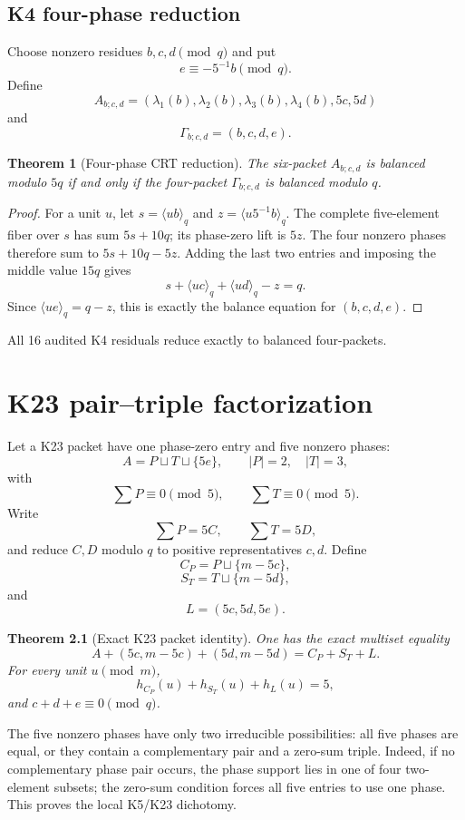 \documentclass[11pt,oneside]{book}
\newtheorem{theorem}{Theorem}[chapter]
\theoremstyle{definition}
\theoremstyle{remark}
\begin{document}
\section{K4 four-phase reduction}
Choose nonzero residues \(b,c,d\pmod q\) and put
\[
e\equiv-5^{-1}b\pmod q.
\]
Define
\[
A_{b;c,d}=
(\lambda_1(b),\lambda_2(b),\lambda_3(b),\lambda_4(b),5c,5d)
\]
and
\[
\Gamma_{b;c,d}=(b,c,d,e).
\]

\begin{theorem}[Four-phase CRT reduction]
The six-packet \(A_{b;c,d}\) is balanced modulo \(5q\) if and only if the four-packet \(\Gamma_{b;c,d}\) is balanced modulo \(q\).
\end{theorem}
\begin{proof}
For a unit \(u\), let \(s=\langle ub\rangle_q\) and \(z=\langle u5^{-1}b\rangle_q\). The complete five-element fiber over \(s\) has sum \(5s+10q\); its phase-zero lift is \(5z\). The four nonzero phases therefore sum to \(5s+10q-5z\). Adding the last two entries and imposing the middle value \(15q\) gives
\[
s+\langle uc\rangle_q+\langle ud\rangle_q-z=q.
\]
Since \(\langle ue\rangle_q=q-z\), this is exactly the balance equation for \((b,c,d,e)\).
\end{proof}

All 16 audited K4 residuals reduce exactly to balanced four-packets.

\chapter{K23 pair--triple factorization}
Let a K23 packet have one phase-zero entry and five nonzero phases:
\[
A=P\sqcup T\sqcup\{5e\},
\qquad |P|=2,
\quad |T|=3,
\]
with
\[
\sum P\equiv0\pmod5,
\qquad
\sum T\equiv0\pmod5.
\]
Write
\[
\sum P=5C,
\qquad
\sum T=5D,
\]
and reduce \(C,D\) modulo \(q\) to positive representatives \(c,d\). Define
\[
C_P=P\sqcup\{m-5c\},
\]
\[
S_T=T\sqcup\{m-5d\},
\]
and
\[
L=(5c,5d,5e).
\]

\begin{theorem}[Exact K23 packet identity]
One has the exact multiset equality
\[
\boxed{
A+(5c,m-5c)+(5d,m-5d)=C_P+S_T+L.
}
\tag{15.1}
\]
For every unit \(u\pmod m\),
\[
h_{C_P}(u)+h_{S_T}(u)+h_L(u)=5,
\]
and \(c+d+e\equiv0\pmod q\).
\end{theorem}

The five nonzero phases have only two irreducible possibilities: all five phases are equal, or they contain a complementary pair and a zero-sum triple. Indeed, if no complementary phase pair occurs, the phase support lies in one of four two-element subsets; the zero-sum condition forces all five entries to use one phase. This proves the local K5/K23 dichotomy.
\end{document}
